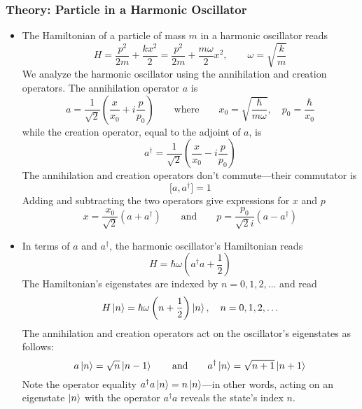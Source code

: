 \documentclass[11pt, a4paper]{article}
\newcommand{\eqtext}[1]{\qquad \text{#1} \qquad}
\begin{document}
\subsubsection{Theory: Particle in a Harmonic Oscillator}
\begin{itemize}
	\item The Hamiltonian of a particle of mass $ m $ in a harmonic oscillator reads
	\begin{equation*}
		H = \frac{p^{2}}{2m} + \frac{kx^{2}}{2} = \frac{p^{2}}{2m} + \frac{m\omega}{2}x^{2}, \qquad \omega = \sqrt{\frac{k}{m}}
	\end{equation*}
	We analyze the harmonic oscillator using the annihilation and creation operators. The annihilation operator $ a $ is
	\begin{equation*}
		a = \frac{1}{\sqrt{2}}\left(\frac{x}{x_{0}} + i\frac{p}{p_{0}}\right) \eqtext{where} x_{0} = \sqrt{\frac{\hbar}{m\omega}}, \quad p_{0} = \frac{\hbar}{x_{0}}
	\end{equation*}
	while the creation operator, equal to the adjoint of $ a $, is
	\begin{equation*}
		a^{\dagger} = \frac{1}{\sqrt{2}}\left(\frac{x}{x_{0}} - i\frac{p}{p_{0}}\right)
	\end{equation*}
	The annihilation and creation operators don't commute---their commutator is 
	\begin{equation*}
		\big[a, a^{\dagger}\big] = 1
	\end{equation*}
	Adding and subtracting the two operators give expressions for $ x $ and $ p $
	\begin{equation*}
		x = \frac{x_{0}}{\sqrt{2}}(a + a^{\dagger}) \eqtext{and} p = \frac{p_{0}}{\sqrt{2}i}(a - a^{\dagger})
	\end{equation*}
	
	\item In terms of $ a $ and $ a^{\dagger} $, the harmonic oscillator's Hamiltonian reads
	\begin{equation*}
		H = \hbar \omega\left (a^{\dagger}a + \frac{1}{2}\right )
	\end{equation*}
	The Hamiltonian's eigenstates are indexed by $ n = 0, 1, 2, \ldots $ and read
	\begin{equation*}
		H \ket{n} = \hbar \omega \left(n + \frac{1}{2}\right)\ket{n}, \quad n = 0, 1, 2, \ldots
	\end{equation*}
	The annihilation and creation operators act on the oscillator's eigenstates as follows:
	\begin{equation*}
		a\ket{n} = \sqrt{n}\ket{n-1} \eqtext{and} a^{\dagger} \ket{n} = \sqrt{n + 1} \ket{n+1}
	\end{equation*}
	Note the operator equality $ a^{\dagger}a \ket{n} = n \ket{n}$---in other words, acting on an eigenstate $ \ket{n} $  with the operator $ a^{\dagger}a $ reveals the state's index $ n $. 
\end{itemize}
\end{document}
